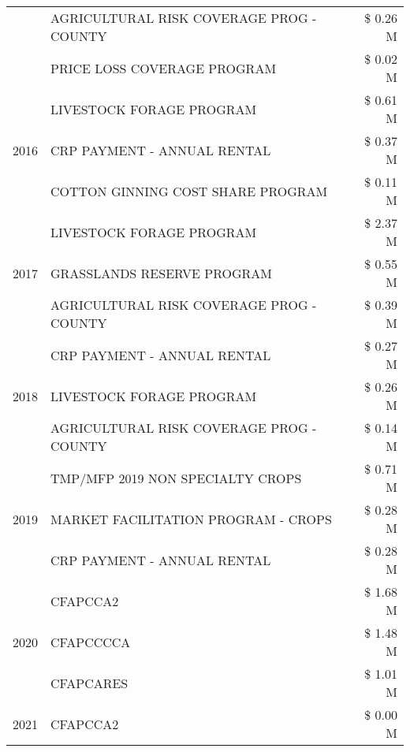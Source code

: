 \begin{tabular}{llr}
 & AGRICULTURAL RISK COVERAGE PROG - COUNTY & \$ 0.26 M \\
 & PRICE LOSS COVERAGE PROGRAM & \$ 0.02 M \\
\cline{1-3}
\multirow[t]{3}{*}{2016} & LIVESTOCK FORAGE PROGRAM                      & \$ 0.61 M \\
 & CRP PAYMENT - ANNUAL RENTAL                   & \$ 0.37 M \\
 & COTTON GINNING COST SHARE PROGRAM             & \$ 0.11 M \\
\cline{1-3}
\multirow[t]{3}{*}{2017} & LIVESTOCK FORAGE PROGRAM & \$ 2.37 M \\
 & GRASSLANDS RESERVE PROGRAM & \$ 0.55 M \\
 & AGRICULTURAL RISK COVERAGE PROG - COUNTY & \$ 0.39 M \\
\cline{1-3}
\multirow[t]{3}{*}{2018} & CRP PAYMENT - ANNUAL RENTAL & \$ 0.27 M \\
 & LIVESTOCK FORAGE PROGRAM & \$ 0.26 M \\
 & AGRICULTURAL RISK COVERAGE PROG - COUNTY & \$ 0.14 M \\
\cline{1-3}
\multirow[t]{3}{*}{2019} & TMP/MFP 2019 NON SPECIALTY CROPS & \$ 0.71 M \\
 & MARKET FACILITATION PROGRAM - CROPS & \$ 0.28 M \\
 & CRP PAYMENT - ANNUAL RENTAL & \$ 0.28 M \\
\cline{1-3}
\multirow[t]{3}{*}{2020} & CFAPCCA2 & \$ 1.68 M \\
 & CFAPCCCCA & \$ 1.48 M \\
 & CFAPCARES & \$ 1.01 M \\
\cline{1-3}
2021 & CFAPCCA2 & \$ 0.00 M \\
\cline{1-3}
\bottomrule
\end{tabular}
